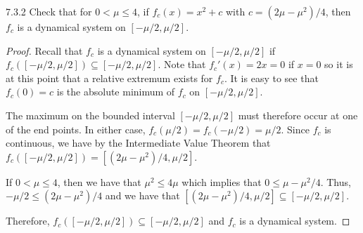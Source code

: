 \begin{problem}{7.3.2}
  Check that for $0 < \mu \leq 4$, if $f_c(x) =x^2 + c$ with $c = (2\mu - \mu^2)/4$,
  then $f_c$ is a dynamical system on $[-\mu/2, \mu/2]$.
\end{problem}

\begin{proof}
  Recall that $f_c$ is a dynamical system on $[-\mu/2, \mu/2]$ if $f_c([-\mu/2, \mu/2]) \subseteq [-\mu/2, \mu/2]$.
  Note that $f_c'(x) = 2x = 0$ if $x=0$ so it is at this point that a relative extremum exists for $f_c$.
  It is easy to see that $f_c(0) = c$ is the absolute minimum of $f_c$ on $[-\mu/2, \mu/2]$.

  The maximum on the bounded interval $[-\mu/2, \mu/2]$ must therefore occur at one of the end points. In either case,
  $f_c(\mu/2) = f_c(-\mu/2) = \mu/2$. Since $f_c$ is continuous, we have by the Intermediate Value Theorem
  that $f_c([-\mu/2, \mu/2]) = [(2\mu - \mu^2)/4, \mu/2]$.

  If $0 < \mu \leq 4$, then we have that $\mu^2 \leq 4\mu$ which implies that
  $0 \leq \mu - \mu^2/4$. Thus, $-\mu/2 \leq (2\mu - \mu^2)/4$ and we have that
  $[(2\mu - \mu^2)/4, \mu/2] \subseteq [-\mu/2, \mu/2]$.

  Therefore, $f_c([-\mu/2, \mu/2]) \subseteq [-\mu/2, \mu/2]$ and $f_c$ is a dynamical
  system.

\end{proof}
\newpage
